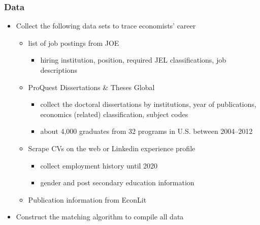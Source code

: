 \documentclass[11pt]{beamer}
\begin{document}
\begin{frame}[label=Data]
	\frametitle{Data}
	\begin{itemize}
		\item Collect the following data sets to trace economists' career
		\begin{itemize}
			\item list of job postings from JOE
			\begin{itemize}
				\item hiring institution, position, required JEL classifications, job descriptions  
			\end{itemize}
		\vspace{0.7 mm}
			\item ProQuest Dissertations \& Theses Global
			\begin{itemize}
				\item collect the doctoral dissertations by institutions, year of publications, economics (related) classification, subject codes
				\item about 4,000 graduates from 32 programs in U.S. between 2004--2012 
			\end{itemize}
		\vspace{0.7 mm}				
			\item Scrape CVs on the web or Linkedin experience profile
			\begin{itemize}
				\item collect employment history until 2020
				\item gender and post secondary education information
			\end{itemize}
		\vspace{0.7 mm}
			\item Publication information from EconLit
		\end{itemize}
	\vspace{1 mm}
		\item Construct the matching algorithm to compile all data  \hyperlink{appendix}{}
	\end{itemize}
\end{frame}
\end{document}

